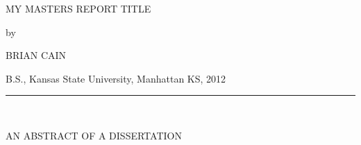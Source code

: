 \begin{center}

   \vspace{1cm}


   \large MY MASTERS REPORT TITLE\\

   \vspace{0.5cm}

   by\\

   \vspace{0.5cm}


   \large BRIAN CAIN\\

   \vspace{0.5cm}


   B.S., Kansas State University, Manhattan KS, 2012\\

   \vspace{0.55cm}
   \rule{2in}{0.5pt}\\
   \vspace{0.75cm}

   {\large AN ABSTRACT OF A DISSERTATION}\\


\end{center}
